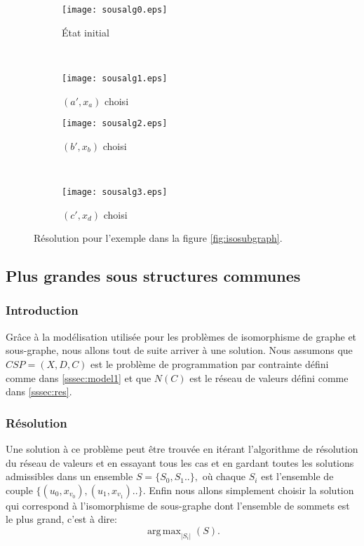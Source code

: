 \documentclass[french]{article}
\theoremstyle{definition}
\theoremstyle{remark}
\DeclareMathOperator*{\argmax}{arg\,max}
\begin{document}
\begin{figure*}[t!]
	\begin{subfigure}[t]{0.5\textwidth}
		\centering
		\texttt{[image: sousalg0.eps]}
		\caption{État initial}
	\end{subfigure}%
	~
	\begin{subfigure}[t]{0.5\textwidth}
		\centering
		\texttt{[image: sousalg1.eps]}
		\caption{$(a', x_a)$ choisi}
	\end{subfigure}
	
	\begin{subfigure}[t]{0.5\textwidth}
		\centering
		\texttt{[image: sousalg2.eps]}
		\caption{$(b', x_b)$ choisi}
	\end{subfigure}
	~
	\begin{subfigure}[t]{0.5\textwidth}
		\centering
		\texttt{[image: sousalg3.eps]}
		\caption{$(c', x_d)$ choisi}
	\end{subfigure}
	
	\caption{\label{fig:sousalgstar} Résolution pour l'exemple dans la figure \ref{fig:isosubgraph}.}
\end{figure*}

\newpage
\subsection{Plus grandes sous structures communes}
\subsubsection{Introduction}
Grâce à la modélisation utilisée pour les problèmes de isomorphisme de graphe et sous-graphe, nous allons tout de suite arriver à une solution. Nous assumons que $CSP=(X,D,C)$ est le problème de programmation par contrainte défini comme dans \ref{sssec:model1} et que $N(C)$ est le réseau de valeurs défini comme dans \ref{sssec:res}.

\subsubsection{Résolution}
Une solution à ce problème peut être trouvée en itérant l'algorithme de résolution du réseau de valeurs et en essayant tous les cas et en gardant toutes les solutions admissibles dans un ensemble $S=\{S_0, S_1..\},$ où chaque $S_i$ est l'ensemble de couple $\{ (u_0, x_{v_0}), (u_1, x_{v_1}).. \}$. Enfin nous allons simplement choisir la solution qui correspond à l'isomorphisme de sous-graphe dont l'ensemble de sommets est le plus grand, c'est à dire:
\[
\argmax_{|S_i|} (S).
\]
\end{document}
